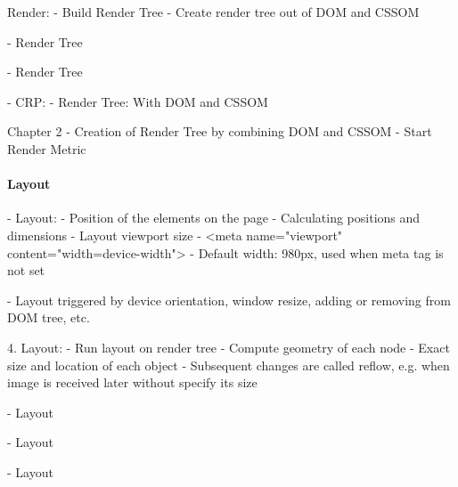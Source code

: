 Render:
- Build Render Tree
- Create render tree out of DOM and CSSOM


- Render Tree


- Render Tree




- CRP:
- Render Tree: With DOM and CSSOM



Chapter 2
- Creation of Render Tree by combining DOM and CSSOM
- Start Render Metric





\paragraph{Layout}





- Layout:
	- Position of the elements on the page
	- Calculating positions and dimensions
	- Layout viewport size
	- <meta name="viewport" content="width=device-width">
	- Default width: 980px, used when meta tag is not set

	- Layout triggered by device orientation, window resize, adding or removing from DOM tree, etc.
	

4. Layout:
- Run layout on render tree
- Compute geometry of each node
- Exact size and location of each object
- Subsequent changes are called reflow, e.g. when image is received later without specify its size


- Layout


- Layout


- Layout



